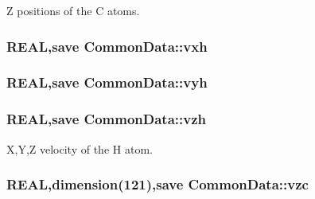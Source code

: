 Z positions of the C atoms. \hypertarget{namespace_common_data_a82357dbd5bbd2700a2a5ee66874b8e43}{
\subsubsection[{vxh}]{\setlength{\rightskip}{0pt plus 5cm}REAL,save {\bf CommonData::vxh}}}
\label{namespace_common_data_a82357dbd5bbd2700a2a5ee66874b8e43}
\hypertarget{namespace_common_data_aabc4c29fca54ecb40e7edb7253d05f30}{
\subsubsection[{vyh}]{\setlength{\rightskip}{0pt plus 5cm}REAL,save {\bf CommonData::vyh}}}
\label{namespace_common_data_aabc4c29fca54ecb40e7edb7253d05f30}
\hypertarget{namespace_common_data_a0d934df8fa7969c9e8b25f8338b68bb7}{
\subsubsection[{vzh}]{\setlength{\rightskip}{0pt plus 5cm}REAL,save {\bf CommonData::vzh}}}
\label{namespace_common_data_a0d934df8fa7969c9e8b25f8338b68bb7}


X,Y,Z velocity of the H atom. \hypertarget{namespace_common_data_ac22677afeff86b9a93bcbb4447a213aa}{
\subsubsection[{vzc}]{\setlength{\rightskip}{0pt plus 5cm}REAL,dimension(121),save {\bf CommonData::vzc}}}
\label{namespace_common_data_ac22677afeff86b9a93bcbb4447a213aa}


